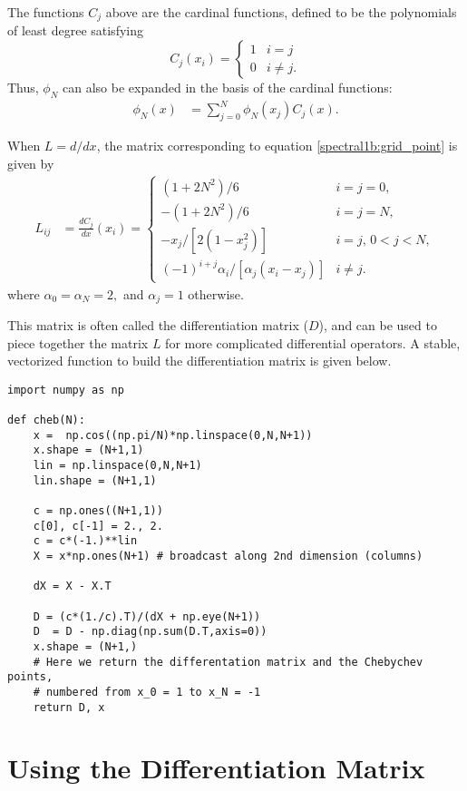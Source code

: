 The functions $C_j$ above are the cardinal functions, defined to be the polynomials of least degree satisfying
\begin{equation*}
C_j(x_i) = \begin{cases} 1 & i=j \\ 0 & i \not = j.
   \end{cases}
\end{equation*}
Thus, $\phi_N$ can also be expanded in the basis of the cardinal functions: 
\begin{align*}
	\phi_N(x) &= \sum_{j=0}^N \phi_N(x_j)C_j(x).
\end{align*}

When $L = d/dx$, the matrix corresponding to equation \ref{spectral1b:grid_point} is given by 
\begin{align*}
L_{ij} &= \frac{dC_j}{dx}(x_i) = 
\begin{cases} (1+2N^2)/6 & i=j=0, \\ -(1+2N^2)/6 & i=j=N, \\
-x_j/[2(1-x_j^2)] & i=j, \, 0<j<N, \\ 
(-1)^{i+j}\alpha_i/[\alpha_j(x_i-x_j)] & i \not = j.
   \end{cases}
\end{align*}
where $\alpha_0 = \alpha_N = 2,$ and $\alpha_j = 1$ otherwise. 

This matrix is often called the differentiation matrix ($D$), and can be used to piece together the matrix $L$ for more complicated differential operators. 
A stable, vectorized function to build the differentiation matrix is given below. 


\begin{lstlisting}
import numpy as np

def cheb(N):
	x =  np.cos((np.pi/N)*np.linspace(0,N,N+1))
	x.shape = (N+1,1)
	lin = np.linspace(0,N,N+1)
	lin.shape = (N+1,1)
	
	c = np.ones((N+1,1))
	c[0], c[-1] = 2., 2.
	c = c*(-1.)**lin
	X = x*np.ones(N+1) # broadcast along 2nd dimension (columns)
	
	dX = X - X.T
	
	D = (c*(1./c).T)/(dX + np.eye(N+1))
	D  = D - np.diag(np.sum(D.T,axis=0))
	x.shape = (N+1,)
	# Here we return the differentation matrix and the Chebychev points, 
	# numbered from x_0 = 1 to x_N = -1
	return D, x

\end{lstlisting}



\section*{Using the Differentiation Matrix}


